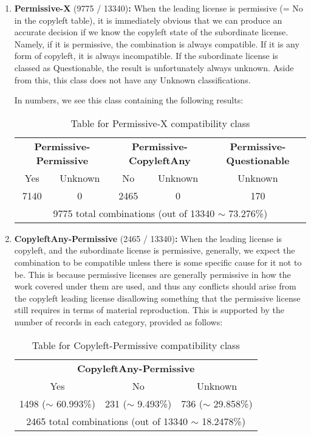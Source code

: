 \begin{enumerate}
	\item \textbf{Permissive-X} (9775 / 13340)\textbf{:} When the leading license is permissive (= No in the copyleft table), it is immediately obvious that we can produce an accurate decision if we know the copyleft state of the subordinate license. Namely, if it is permissive, the combination is always compatible. If it is any form of copyleft, it is always incompatible. If the subordinate license is classed as Questionable, the result is unfortunately always unknown. Aside from this, this class does not have any Unknown classifications.
	
	In numbers, we see this class containing the following results:
	
	\begin{table}[h]
		\caption{Table for Permissive-X compatibility class}
		\label{tab:permissive-x-table}
		\centering
		\begin{tabular}{|cc|cc|c|}
			\hline
			\multicolumn{2}{|c|}{\textbf{Permissive-Permissive}} & \multicolumn{2}{|c|}{\textbf{Permissive-CopyleftAny}} & \textbf{Permissive-Questionable} \\
			Yes & Unknown & No & Unknown & Unknown \\
			7140 & 0 & 2465 & 0 & 170 \\\hline
			\multicolumn{5}{|c|}{9775 total combinations (out of 13340 $\sim$ 73.276\%)} \\
			\hline
		\end{tabular}
	\end{table}
	
	\item \textbf{CopyleftAny-Permissive} (2465 / 13340)\textbf{:} When the leading license is copyleft, and the subordinate license is permissive, generally, we expect the combination to be compatible unless there is some specific cause for it not to be. This is because permissive licenses are generally permissive in how the work covered under them are used, and thus any conflicts should arise from the copyleft leading license disallowing something that the permissive license still requires in terms of material reproduction. This is supported by the number of records in each category, provided as follows:
	
	\begin{table}[h]
		\caption{Table for Copyleft-Permissive compatibility class}
		\label{tab:copyleft-permissive-table}
		\centering
		\begin{tabular}{|c|c|c|}
			\hline
			\multicolumn{3}{|c|}{\textbf{CopyleftAny-Permissive}} \\
			Yes & No & Unknown \\
			1498 ($\sim$ 60.993\%) & 231 ($\sim$ 9.493\%) & 736 ($\sim$ 29.858\%) \\\hline
			\multicolumn{3}{|c|}{2465 total combinations (out of 13340 $\sim$ 18.2478\%)} \\
			\hline
		\end{tabular}
	\end{table}
	

\end{enumerate}
